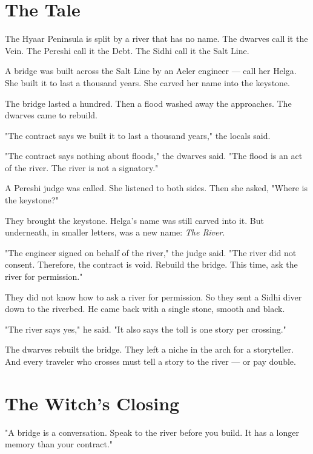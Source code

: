 \documentclass[10pt,twoside]{book}
\begin{document}
\section*{The Tale}
The Hyaar Peninsula is split by a river that has no name. The dwarves call it the Vein. The Pereshi call it the Debt. The Sidhi call it the Salt Line.

A bridge was built across the Salt Line by an Aeler engineer --- call her Helga. She built it to last a thousand years. She carved her name into the keystone.

The bridge lasted a hundred. Then a flood washed away the approaches. The dwarves came to rebuild.

"The contract says we built it to last a thousand years," the locals said.

"The contract says nothing about floods," the dwarves said. "The flood is an act of the river. The river is not a signatory."

A Pereshi judge was called. She listened to both sides. Then she asked, "Where is the keystone?"

They brought the keystone. Helga's name was still carved into it. But underneath, in smaller letters, was a new name: \textit{The River}.

"The engineer signed on behalf of the river," the judge said. "The river did not consent. Therefore, the contract is void. Rebuild the bridge. This time, ask the river for permission."

They did not know how to ask a river for permission. So they sent a Sidhi diver down to the riverbed. He came back with a single stone, smooth and black.

"The river says yes," he said. "It also says the toll is one story per crossing."

The dwarves rebuilt the bridge. They left a niche in the arch for a storyteller. And every traveler who crosses must tell a story to the river --- or pay double.

\section*{The Witch's Closing}
"A bridge is a conversation. Speak to the river before you build. It has a longer memory than your contract."
\end{document}
